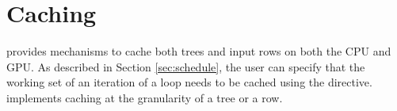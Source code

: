 
\section{Caching}
\label{sec:caching}


\Treebeard{} provides mechanisms to cache both trees and input rows 
on both the CPU and GPU. As described in Section \ref{sec:schedule}, 
the user can specify that the working set of an iteration of a loop
needs to be cached using the  directive. 
\Treebeard{} implements caching at the granularity of a tree or a row.

